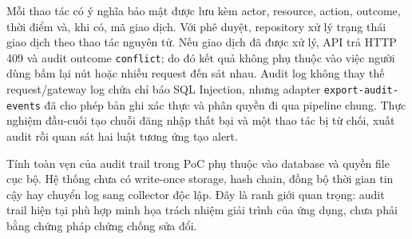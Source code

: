 Mỗi thao tác có ý nghĩa bảo mật được lưu kèm actor, resource, action, outcome,
thời điểm và, khi có, mã giao dịch. Với phê duyệt, repository xử lý trạng thái
giao dịch theo thao tác nguyên tử. Nếu giao dịch đã được xử lý, API trả HTTP
409 và audit outcome \texttt{conflict}; do đó kết quả không phụ thuộc vào việc
người dùng bấm lại nút hoặc nhiều request đến sát nhau. Audit log không thay
thế request/gateway log chứa chỉ báo SQL Injection, nhưng adapter
\texttt{export-audit-events} đã cho phép bản ghi xác thực và phân quyền đi qua
pipeline chung. Thực nghiệm đầu-cuối tạo chuỗi đăng nhập thất bại và một thao
tác bị từ chối, xuất audit rồi quan sát hai luật tương ứng tạo alert.

Tính toàn vẹn của audit trail trong PoC phụ thuộc vào database và quyền file
cục bộ. Hệ thống chưa có write-once storage, hash chain, đồng bộ thời gian tin
cậy hay chuyển log sang collector độc lập. Đây là ranh giới quan trọng: audit
trail hiện tại phù hợp minh họa trách nhiệm giải trình của ứng dụng, chưa phải
bằng chứng pháp chứng chống sửa đổi.
